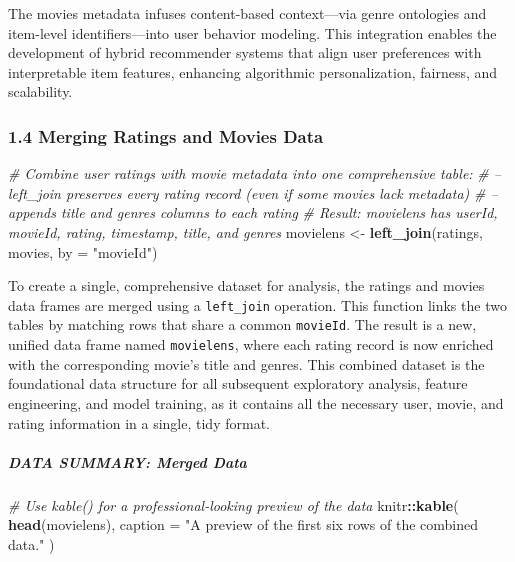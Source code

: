 \documentclass[
]{article}
\newenvironment{Shaded}{\begin{snugshade}}{\end{snugshade}}
\newcommand{\AttributeTok}[1]{\textcolor[rgb]{0.13,0.29,0.53}{#1}}
\newcommand{\CommentTok}[1]{\textcolor[rgb]{0.56,0.35,0.01}{\textit{#1}}}
\newcommand{\FunctionTok}[1]{\textcolor[rgb]{0.13,0.29,0.53}{\textbf{#1}}}
\newcommand{\NormalTok}[1]{#1}
\newcommand{\OtherTok}[1]{\textcolor[rgb]{0.56,0.35,0.01}{#1}}
\newcommand{\SpecialCharTok}[1]{\textcolor[rgb]{0.81,0.36,0.00}{\textbf{#1}}}
\newcommand{\StringTok}[1]{\textcolor[rgb]{0.31,0.60,0.02}{#1}}
\begin{document}
The movies metadata infuses content-based context---via genre ontologies
and item-level identifiers---into user behavior modeling. This
integration enables the development of hybrid recommender systems that
align user preferences with interpretable item features, enhancing
algorithmic personalization, fairness, and scalability.

\newpage

\subsubsection{1.4 Merging Ratings and Movies
Data}\label{merging-ratings-and-movies-data}

\begin{Shaded}
\begin{Highlighting}[]
\CommentTok{\# Combine user ratings with movie metadata into one comprehensive table:}
\CommentTok{\# – left\_join preserves every rating record (even if some movies lack metadata)}
\CommentTok{\# – appends title and genres columns to each rating}
\CommentTok{\# Result: movielens has userId, movieId, rating, timestamp, title, and genres}
\NormalTok{movielens }\OtherTok{\textless{}{-}} \FunctionTok{left\_join}\NormalTok{(ratings, movies, }\AttributeTok{by =} \StringTok{"movieId"}\NormalTok{)}
\end{Highlighting}
\end{Shaded}

To create a single, comprehensive dataset for analysis, the ratings and
movies data frames are merged using a \texttt{left\_join} operation.
This function links the two tables by matching rows that share a common
\texttt{movieId}. The result is a new, unified data frame named
\texttt{movielens}, where each rating record is now enriched with the
corresponding movie's title and genres. This combined dataset is the
foundational data structure for all subsequent exploratory analysis,
feature engineering, and model training, as it contains all the
necessary user, movie, and rating information in a single, tidy format.
\newpage

\subparagraph{DATA SUMMARY: Merged Data}\label{data-summary-merged-data}

\begin{Shaded}
\begin{Highlighting}[]
\CommentTok{\# Use kable() for a professional{-}looking preview of the data}
\NormalTok{knitr}\SpecialCharTok{::}\FunctionTok{kable}\NormalTok{(}
  \FunctionTok{head}\NormalTok{(movielens), }
  \AttributeTok{caption =} \StringTok{"A preview of the first six rows of the combined data."}
\NormalTok{)}
\end{Highlighting}
\end{Shaded}
\end{document}
